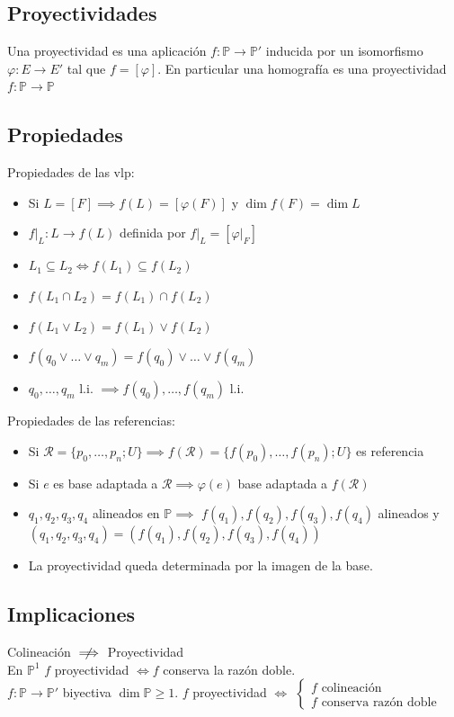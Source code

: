 \documentclass{myclass}
\newcommand{\R}{\mathcal{R}}
\renewcommand{\phi}{\varphi}
\renewcommand{\P}{\mathbb{P}}
\begin{document}
\subsection{Proyectividades}
Una proyectividad es una aplicación $f:\P \to \P'$ inducida por un isomorfismo  $\varphi:E\to E'$ tal que  $f=[\varphi]$. En particular una homografía es una proyectividad $f:\P\to \P$

\subsection{Propiedades}
Propiedades de las vlp:
\begin{itemize}
    \item Si $L = [F] \implies f(L) =  [\phi(F)]$ y $\dim f(F) = \dim L$
    \item $f|_L: L\to f(L)$ definida por $f|_L = [\phi|_F]$
    \item $L_1\subseteq L_2 \iff f(L_1) \subseteq f(L_2)$
    \item $f(L_1\cap L_2) = f(L_1)\cap f(L_2)$
    \item $f(L_1\vee L_2) = f(L_1)\vee f(L_2)$
    \item $f(q_0\vee \ldots \vee q_m) = f(q_0)\vee \ldots \vee f(q_m)$
    \item $q_0, \ldots, q_m$ l.i. $\implies f(q_0), \ldots, f(q_m)$ l.i.
\end{itemize}
Propiedades de las referencias:
\begin{itemize}
    \item Si $\R = \{p_0, \ldots, p_n; U\} \implies f(\R)=\{f(p_0), \ldots, f(p_n); U\}$ es referencia
	\item Si $e$ es base adaptada a $\mathcal{R} \implies \phi(e)$ base adaptada a $f(\mathcal{R})$ 
	\item $q_1, q_2, q_3, q_4$ alineados en $\P \implies$ $f(q_1), f(q_2), f(q_3), f(q_4)$ alineados y $(q_1, q_2, q_3, q_4) = (f(q_1), f(q_2), f(q_3), f(q_4))$
	\item La proyectividad queda determinada por la imagen de la base.
\end{itemize}

\subsection{Implicaciones}
Colineación $\centernot\implies$ Proyectividad \\
En $\P^1$  $f$ proyectividad  $\iff f$ conserva la razón doble. \\
$f:\P \to \P'$ biyectiva  $\dim\P \ge 1$. $f$ proyectividad  $\iff$  $\begin{cases}
  f \text{ colineación} \\
  f \text{ conserva razón doble}
\end{cases}$
\end{document}
